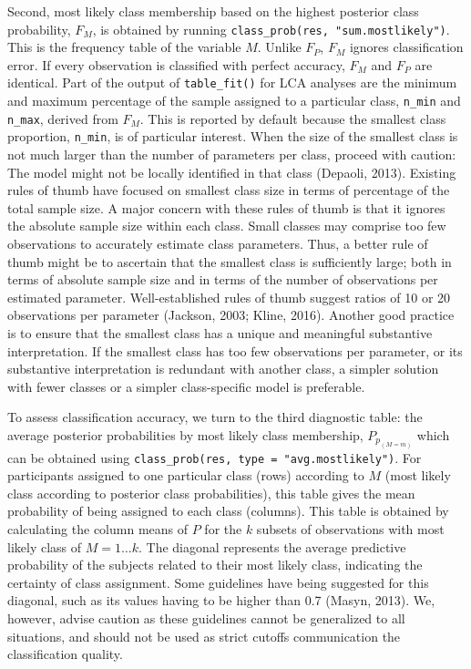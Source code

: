 \documentclass[
  ,man,floatsintext]{apa6}
\begin{document}
Second, most likely class membership based on the highest posterior class probability, \(F_M\), is obtained by running \texttt{class\_prob(res,\ "sum.mostlikely")}.
This is the frequency table of the variable \(M\).
Unlike \(F_P\), \(F_M\) ignores classification error.
If every observation is classified with perfect accuracy,
\(F_M\) and \(F_P\) are identical.
Part of the output of \texttt{table\_fit()} for LCA analyses
are the minimum and maximum percentage of the sample assigned to a particular class, \texttt{n\_min} and \texttt{n\_max}, derived from \(F_M\).
This is reported by default because the smallest class proportion, \texttt{n\_min}, is of particular interest.
When the size of the smallest class is not much larger than the number of parameters per class,
proceed with caution:
The model might not be locally identified in that class (Depaoli, 2013).
Existing rules of thumb have focused on smallest class size in terms of percentage of the total sample size.
A major concern with these rules of thumb is that it ignores the absolute sample size within each class.
Small classes may comprise too few observations to accurately estimate class parameters.
Thus, a better rule of thumb might be to ascertain that the smallest class is sufficiently large;
both in terms of absolute sample size and in terms of the number of observations per estimated parameter.
Well-established rules of thumb suggest ratios of 10 or 20 observations per parameter (Jackson, 2003; Kline, 2016).
Another good practice is to ensure that the smallest class has a unique and meaningful substantive interpretation.
If the smallest class has too few observations per parameter, or its substantive interpretation is redundant with another class,
a simpler solution with fewer classes or a simpler class-specific model is preferable.

To assess classification accuracy, we turn to the third diagnostic table:
the average posterior probabilities by most likely class membership, \(P_{p_{(M = m)}}\)
which can be obtained using \texttt{class\_prob(res,\ type\ =\ "avg.mostlikely")}.
For participants assigned to one particular class (rows) according to \(M\) (most likely class according to posterior class probabilities),
this table gives the mean probability of being assigned to each class (columns).
This table is obtained by calculating the column means of \(P\) for the
\(k\) subsets of observations with most likely class of \(M = 1 \ldots k\).
The diagonal represents the average predictive probability of the subjects related
to their most likely class, indicating the certainty of class assignment.
Some guidelines have being suggested for this diagonal,
such as its values having to be higher than 0.7 (Masyn, 2013).
We, however, advise caution as these guidelines cannot be generalized to all situations,
and should not be used as strict cutoffs communication the classification quality.
\end{document}
